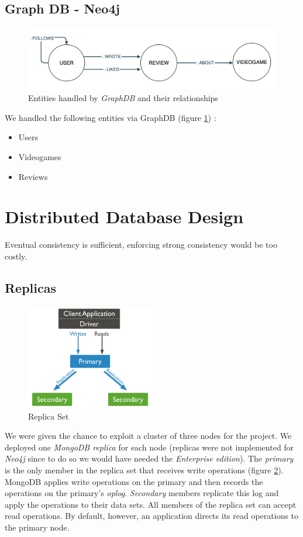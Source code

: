 \subsection{Graph DB - Neo4j}
\begin{figure}[t]
	\centering
	\includegraphics[width=1\textwidth]{chapter3/img/graph.png}
	\caption{Entities handled by \emph{GraphDB} and their relationships}
	\label{fig:graph}
\end{figure}
We handled the following entities via GraphDB (figure \ref{fig:graph}) :
\begin{itemize}
	\item Users 
	\item Videogames 
	\item Reviews
\end{itemize}
\section{Distributed Database Design}
Eventual consistency is sufficient, enforcing strong consistency would be too costly. 
\subsection{Replicas}
\begin{figure}[t]
	\centering
	\includegraphics[width=0.5\textwidth]{chapter3/img/replica.png}
	\caption{Replica Set}
	\label{fig:replica}
\end{figure}
We were given the chance to exploit a cluster of three nodes for the project. We deployed one \emph{MongoDB replica} for each node (replicas were not implemented for \emph{Neo4j} since to do so we would have needed the \emph{Enterprise edition}). 
The \emph{primary} is the only member in the replica set that receives write operations (figure \ref{fig:replica}). MongoDB applies write operations on the primary and then records the operations on the primary's \emph{oplog}. \emph{Secondary} members replicate this log and apply the operations to their data sets.
All members of the replica set can accept read operations. By default, however, an application directs its read operations to the primary node.
